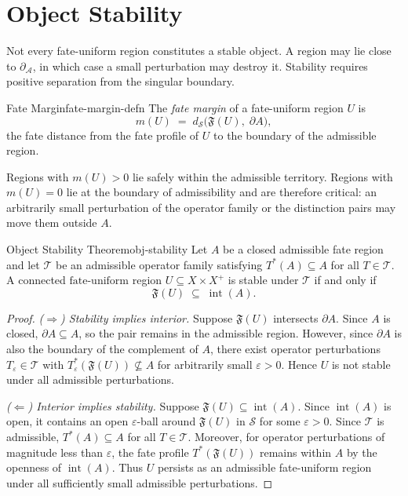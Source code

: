 \documentclass[12pt,twoside,openright]{book}
\newcommand{\transfam}{\mathcal{T}}       %
\newcommand{\distPairs}{X\times X}
\newcommand{\fateMap}{\mathfrak{F}}
\newcommand{\fateSpace}{\mathcal{S}}
\newcommand{\singSet}{\partial_{\!\mathcal{A}}}
\newcommand{\fateMargin}[1]{m(#1)}
\newcommand{\admRegion}{A}
\newcommand{\fateUnif}{\text{fate-uniform}}
\providecommand{\singSet}{\partial_{\!\mathcal{A}}}
\providecommand{\fateMargin}[1]{m(#1)}
\providecommand{\admRegion}{A}
\providecommand{\fateUnif}{\text{fate-uniform}}
\begin{document}
\section{Object Stability}

Not every fate-uniform region constitutes a stable object.
A region may lie close to $\singSet$, in which case a small
perturbation may destroy it. Stability requires positive
separation from the singular boundary.

\begin{definition}{Fate Margin}{fate-margin-defn}
The \emph{fate margin} of a fate-uniform region $U$ is
\[
  \fateMargin{U}
  \;=\;
  d_{\fateSpace}\bigl(
    \fateMap(U),\;\partial\admRegion
  \bigr),
\]
the fate distance from the fate profile of $U$ to the boundary
of the admissible region.
\end{definition}

Regions with $\fateMargin{U}>0$ lie safely within the
admissible territory. Regions with $\fateMargin{U}=0$ lie at
the boundary of admissibility and are therefore critical: an
arbitrarily small perturbation of the operator family or the
distinction pairs may move them outside $\admRegion$.

\begin{theorem}{Object Stability Theorem}{obj-stability}
Let $\admRegion$ be a closed admissible fate region and let
$\transfam$ be an admissible operator family satisfying
$T^*(\admRegion)\subseteq\admRegion$ for all $T\in\transfam$.
A connected $\fateUnif$ region $U\subseteq\distPairs^+$ is
stable under $\transfam$ if and only if
\[
  \fateMap(U)\;\subseteq\;\operatorname{int}(\admRegion).
\]
\begin{proof}
\emph{($\Rightarrow$) Stability implies interior.}
Suppose $\fateMap(U)$ intersects $\partial\admRegion$. Since
$\admRegion$ is closed, $\partial\admRegion\subseteq\admRegion$,
so the pair remains in the admissible region. However, since
$\partial\admRegion$ is also the boundary of the complement of
$\admRegion$, there exist operator perturbations
$T_\varepsilon\in\transfam$ with
$T_\varepsilon^*(\fateMap(U))\not\subseteq\admRegion$ for
arbitrarily small $\varepsilon>0$. Hence $U$ is not stable
under all admissible perturbations.

\emph{($\Leftarrow$) Interior implies stability.}
Suppose $\fateMap(U)\subseteq\operatorname{int}(\admRegion)$.
Since $\operatorname{int}(\admRegion)$ is open, it contains an
open $\varepsilon$-ball around $\fateMap(U)$ in $\fateSpace$
for some $\varepsilon>0$. Since $\transfam$ is admissible,
$T^*(\admRegion)\subseteq\admRegion$ for all $T\in\transfam$.
Moreover, for operator perturbations of magnitude less than
$\varepsilon$, the fate profile $T^*(\fateMap(U))$ remains
within $\admRegion$ by the openness of
$\operatorname{int}(\admRegion)$. Thus $U$ persists as an
admissible fate-uniform region under all sufficiently small
admissible perturbations.
\end{proof}
\end{theorem}
\end{document}
